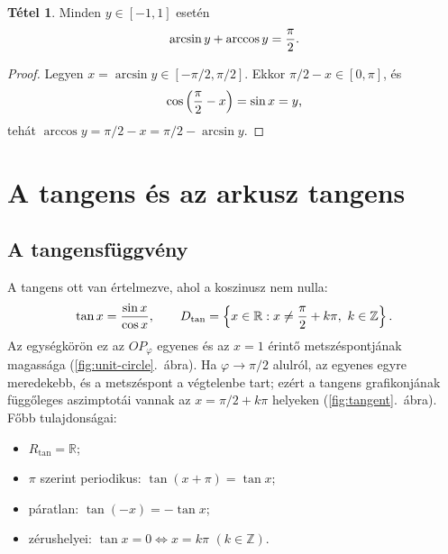 \documentclass[11pt]{scrartcl}
\theoremstyle{definition}
\newtheorem{theorem}[definition]{Tétel}
\newtheorem{example}[definition]{Példa}
\theoremstyle{remark}
\begin{document}
\begin{theorem}
	Minden $y \in [-1, 1]$ esetén
	\[
		\arcsin y + \arccos y = \frac{\pi}{2}\text.
	\]
\end{theorem}

\begin{proof}
	Legyen $x = \arcsin y \in \left[-\pi/2, \pi/2\right]$.
	Ekkor $\pi/2 - x \in [0, \pi]$, és
	\[
		\cos\left(\frac{\pi}{2} - x\right) = \sin x = y\text,
	\]
	tehát $\arccos y = \pi/2 - x = \pi/2 - \arcsin y$.
\end{proof}

%

\section{A tangens és az arkusz tangens}

\subsection{A tangensfüggvény}

A tangens ott van értelmezve, ahol a koszinusz nem nulla:
\[
	\tan x = \frac{\sin x}{\cos x}, \qquad
	D_{\tan} = \left\{ x \in \mathbb{R} : x \ne \frac{\pi}{2} + k\pi,\
	k \in \mathbb{Z} \right\}\text.
\]
Az egységkörön ez az $OP_\varphi$ egyenes és az $x = 1$ érintő metszéspontjának
magassága (\ref{fig:unit-circle}.~ábra). Ha $\varphi \to \pi/2$ alulról,
az egyenes egyre meredekebb, és a metszéspont a végtelenbe tart; ezért a
tangens grafikonjának függőleges aszimptotái vannak az
$x = \pi / 2 + k\pi$ helyeken (\ref{fig:tangent}.~ábra). Főbb
tulajdonságai:
\begin{itemize}
	\item $R_{\tan} = \mathbb{R}$;
	\item $\pi$ szerint periodikus: $\tan(x + \pi) = \tan x$;
	\item páratlan: $\tan(-x) = -\tan x$;
	\item zérushelyei: $\tan x = 0 \iff x = k\pi$ $(k \in \mathbb{Z})$.
\end{itemize}
\end{document}
